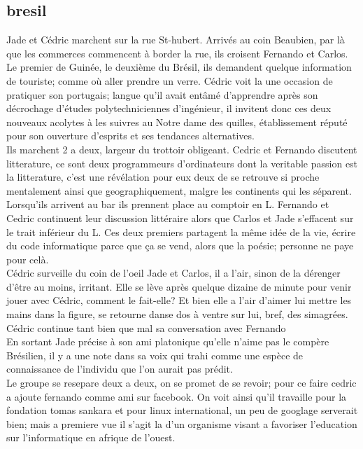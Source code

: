 \documentclass{article}
\begin{document}
\subsection{bresil}
Jade et Cédric marchent sur la rue St-hubert. Arrivés au coin Beaubien, par là
que les commerces commencent à border la rue, ils croisent Fernando et Carlos.
Le premier de Guinée, le deuxième du Brésil, ils demandent quelque information
de touriste; comme où aller prendre un verre. Cédric voit la une occasion de
pratiquer son portugais; langue qu'il avait entâmé d'apprendre après son
décrochage d'études polytechniciennes d'ingénieur, il invitent donc ces deux
nouveaux acolytes à les suivres au Notre dame des quilles, établissement réputé
pour son ouverture d'esprits et ses tendances alternatives.\\

Ils marchent 2 a deux, largeur du trottoir obligeant. Cedric et Fernando
discutent litterature, ce sont deux programmeurs d'ordinateurs dont la veritable
passion est la litterature, c'est une révélation pour eux deux de se retrouve si
proche mentalement ainsi que geographiquement, malgre les continents qui les
séparent.\\

Lorsqu'ils arrivent au bar ils prennent place au comptoir en L. Fernando et
Cedric continuent leur discussion littéraire alors que Carlos et Jade s'effacent
sur le trait inférieur du L. Ces deux premiers partagent la même idée de la vie,
écrire du code informatique parce que ça se vend, alors que la poésie; personne
ne paye pour celà.\\

Cédric surveille du coin de l'oeil Jade et Carlos, il a l'air, sinon de la
dérenger d'être au moins, irritant. Elle se lève après quelque dizaine de minute
pour venir jouer avec Cédric, comment le fait-elle? Et bien elle a l'air d'aimer
lui mettre les mains dans la figure, se retourne danse dos à ventre sur lui,
bref, des simagrées. Cédric continue tant bien que mal sa conversation avec
Fernando\\

En sortant Jade précise à son ami platonique qu'elle n'aime pas le
compère Brésilien, il y a une note dans sa voix qui trahi comme une
espèce de connaissance de l'individu que l'on aurait pas prédit.\\

Le groupe se resepare deux a deux, on se promet de se revoir;
pour ce faire cedric a ajoute fernando comme ami sur facebook.
On voit ainsi qu'il travaille pour la fondation tomas sankara et
pour linux international, un peu de googlage serverait bien; mais
a premiere vue il s'agit la d'un organisme visant a favoriser l'education
sur l'informatique en afrique de l'ouest.\\
\end{document}
